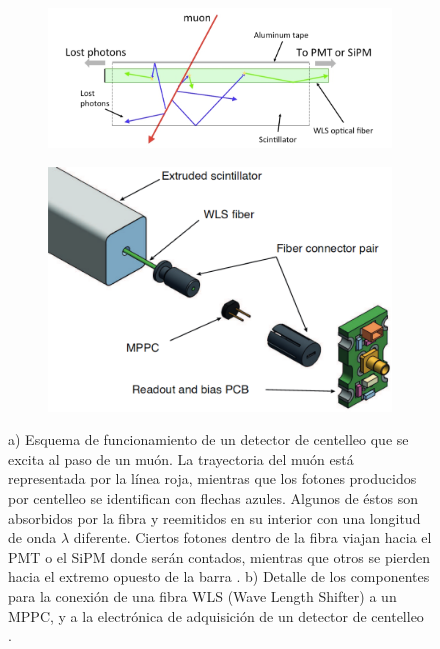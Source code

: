\documentclass[12pt,oneside,openany,letter]{book}
\begin{document}
\begin{figure}[h!]
\begin{center}

\begin{subfigure}{0.7\textwidth}
\includegraphics[width=\textwidth]{images/fibra.jpg}
\caption{}
\label{fibra}
\end{subfigure}

\begin{subfigure}{0.55\textwidth}
\includegraphics[width=\textwidth]{images/scintillator_scheme.png}
\caption{}
\label{scintillator_scheme}
\end{subfigure}
\end{center}

\caption[Esquema de funcionamiento de un detector de centelleo]{a) Esquema de funcionamiento de un detector de centelleo que se excita al paso de un muón. La trayectoria del muón está representada por la línea roja, mientras que los fotones producidos por centelleo se identifican con flechas azules. Algunos de \'estos son absorbidos por la fibra y reemitidos en su interior con una longitud de onda $\lambda$ diferente. Ciertos fotones dentro de la fibra viajan hacia el PMT o el SiPM donde serán contados, mientras que otros se pierden hacia el extremo opuesto de la barra \cite{amiga-etal2016}. b) Detalle de los componentes para la conexión de una fibra WLS (Wave Length Shifter) a un MPPC, y a la electrónica de adquisición de un detector de centelleo \cite{soter2014segmented}.}
  \label{scintillator_general}
\end{figure}
\end{document}
